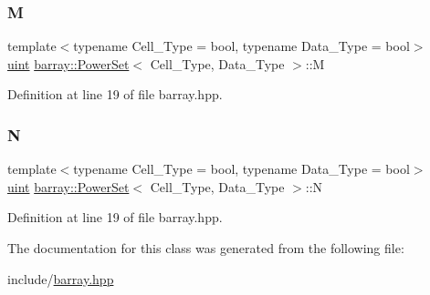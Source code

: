 \subsubsection{\texorpdfstring{M}{M}}
{\footnotesize\ttfamily template$<$typename Cell\+\_\+\+Type  = bool, typename Data\+\_\+\+Type  = bool$>$ \\
\hyperlink{namespacebarray_af9756a31953db233f80a9cfe1ef31c32}{uint} \hyperlink{classbarray_1_1_power_set}{barray\+::\+Power\+Set}$<$ Cell\+\_\+\+Type, Data\+\_\+\+Type $>$\+::M}



Definition at line 19 of file barray.\+hpp.

\mbox{\label{classbarray_1_1_power_set_a778fd87c623a64fa4b4f65c1d4f1b0f3}} 
\subsubsection{\texorpdfstring{N}{N}}
{\footnotesize\ttfamily template$<$typename Cell\+\_\+\+Type  = bool, typename Data\+\_\+\+Type  = bool$>$ \\
\hyperlink{namespacebarray_af9756a31953db233f80a9cfe1ef31c32}{uint} \hyperlink{classbarray_1_1_power_set}{barray\+::\+Power\+Set}$<$ Cell\+\_\+\+Type, Data\+\_\+\+Type $>$\+::N}



Definition at line 19 of file barray.\+hpp.



The documentation for this class was generated from the following file\+:\begin{DoxyCompactItemize}
\item 
include/\hyperlink{barray_8hpp}{barray.\+hpp}\end{DoxyCompactItemize}
